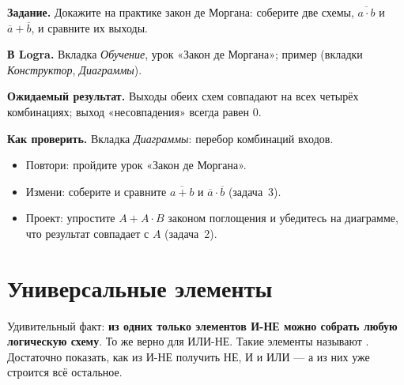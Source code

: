 \begin{diybox}
\textbf{Задание.} Докажите на практике закон де Моргана: соберите две схемы,
$\overline{a\cdot b}$ и $\overline{a}+\overline{b}$, и сравните их выходы.\par
\textbf{В Logra.} Вкладка \emph{Обучение}, урок «Закон де Моргана»; пример
 (вкладки \emph{Конструктор}, \emph{Диаграммы}).\par
\textbf{Ожидаемый результат.} Выходы обеих схем совпадают на всех четырёх
комбинациях; выход «несовпадения» всегда равен 0.\par
\textbf{Как проверить.} Вкладка \emph{Диаграммы}: перебор комбинаций входов.
\begin{itemize}[leftmargin=3.4em,labelwidth=3em,labelsep=0.4em,align=left]
  \item[\stars{1}] Повтори: пройдите урок «Закон де Моргана».
  \item[\stars{2}] Измени: соберите и сравните $\overline{a+b}$ и
    $\overline{a}\cdot\overline{b}$ (задача~3).
  \item[\stars{3}] Проект: упростите $A+A\cdot B$ законом поглощения и убедитесь на
    диаграмме, что результат совпадает с $A$ (задача~2).
\end{itemize}
\end{diybox}

\section{Универсальные элементы}

Удивительный факт: \textbf{из одних только элементов И-НЕ можно собрать любую
логическую схему}. То же верно для ИЛИ-НЕ. Такие элементы называют
. Достаточно показать, как из И-НЕ получить НЕ, И и ИЛИ ---
а из них уже строится всё остальное.

